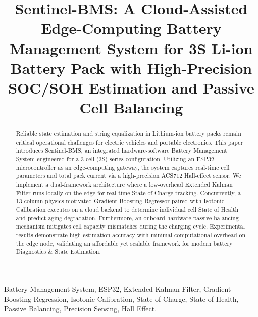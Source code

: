 \documentclass[conference]{IEEEtran}
\begin{document}
\title{Sentinel-BMS: A Cloud-Assisted Edge-Computing Battery Management System for 3S Li-ion Battery Pack with High-Precision SOC/SOH Estimation and Passive Cell Balancing}

\author{
\and
{}
}

\maketitle

\begin{abstract}
Reliable state estimation and string equalization in Lithium-ion battery packs remain critical operational challenges for electric vehicles and portable electronics. This paper introduces Sentinel-BMS, an integrated hardware-software Battery Management System engineered for a 3-cell (3S) series configuration. Utilizing an ESP32 microcontroller as an edge-computing gateway, the system captures real-time cell parameters and total pack current via a high-precision ACS712 Hall-effect sensor. We implement a dual-framework architecture where a low-overhead Extended Kalman Filter runs locally on the edge for real-time State of Charge tracking. Concurrently, a 13-column physics-motivated Gradient Boosting Regressor paired with Isotonic Calibration executes on a cloud backend to determine individual cell State of Health and predict aging degradation. Furthermore, an onboard hardware passive balancing mechanism mitigates cell capacity mismatches during the charging cycle. Experimental results demonstrate high estimation accuracy with minimal computational overhead on the edge node, validating an affordable yet scalable framework for modern battery Diagnostics \& State Estimation.
\end{abstract}

\begin{IEEEkeywords}
Battery Management System, ESP32, Extended Kalman Filter, Gradient Boosting Regression, Isotonic Calibration, State of Charge, State of Health, Passive Balancing, Precision Sensing, Hall Effect.
\end{IEEEkeywords}
\end{document}
